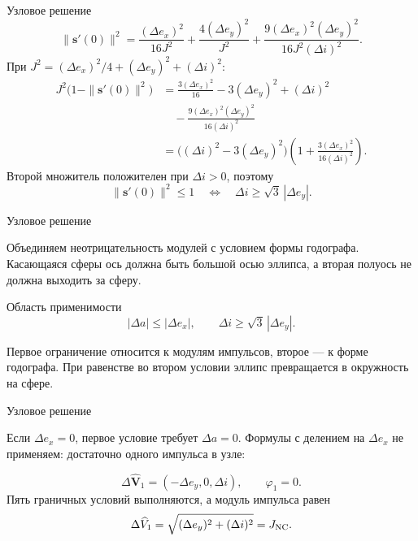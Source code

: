 \documentclass[11pt,aspectratio=169,t]{beamer}
\newcommand{\derivationmathspacing}{%
  \setlength{\abovedisplayskip}{2pt}%
  \setlength{\belowdisplayskip}{3pt}%
  \setlength{\abovedisplayshortskip}{2pt}%
  \setlength{\belowdisplayshortskip}{2pt}%
  \setlength{\jot}{2pt}}
\begin{document}
\begin{frame}{Узловое решение}
\relax
\derivationmathspacing
\[
\|\boldsymbol s'(0)\|^2
 =\frac{(\Delta e_x)^2}{16J^2}
  +\frac{4(\Delta e_y)^2}{J^2}
  +\frac{9(\Delta e_x)^2(\Delta e_y)^2}{16J^2(\Delta i)^2}.
\]
При $J^2=(\Delta e_x)^2/4+(\Delta e_y)^2+(\Delta i)^2$:
\[
\begin{aligned}
J^2\bigl(1-\|\boldsymbol s'(0)\|^2\bigr)
 &=\frac{3(\Delta e_x)^2}{16}-3(\Delta e_y)^2+(\Delta i)^2\\
 &\quad-\frac{9(\Delta e_x)^2(\Delta e_y)^2}{16(\Delta i)^2}\\
 &=\bigl((\Delta i)^2-3(\Delta e_y)^2\bigr)
   \left(1+\frac{3(\Delta e_x)^2}{16(\Delta i)^2}\right).
\end{aligned}
\]
Второй множитель положителен при $\Delta i>0$, поэтому
\[
\|\boldsymbol s'(0)\|^2\leq1
\quad\Longleftrightarrow\quad
\Delta i\geq\sqrt3\,|\Delta e_y|.
\]
\end{frame}

\begin{frame}{Узловое решение}
\relax
\derivationmathspacing
{\justifying
Объединяем неотрицательность модулей с условием формы годографа.
Касающаяся сферы ось должна быть большой осью эллипса,
а вторая полуось не должна выходить за сферу.
\par}
\begin{block}{Область применимости}
\[
|\Delta a|\leq|\Delta e_x|,\qquad
\Delta i\geq\sqrt3\,|\Delta e_y|.
\]
\end{block}
{\justifying
Первое ограничение относится к модулям импульсов, второе ---
к форме годографа. При равенстве во втором условии эллипс
превращается в окружность на сфере.
\par}
\end{frame}

\begin{frame}{Узловое решение}
\relax
\derivationmathspacing
{\justifying
Если $\Delta e_x=0$, первое условие требует $\Delta a=0$.
Формулы с делением на $\Delta e_x$ не применяем: достаточно
одного импульса в узле:
\par}
\[
\Delta\widehat{\boldsymbol V}_1=(-\Delta e_y,0,\Delta i),
\qquad \varphi_1=0.
\]
Пять граничных условий выполняются, а модуль импульса равен
\[
\Delta\widehat V_1
 =\sqrt{(\Delta e_y)^2+(\Delta i)^2}=J_{\rm NC}.
\]
\end{frame}
\end{document}
